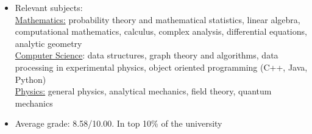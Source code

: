 \documentclass[10pt,a4paper,ragged2e]{altacv}
\begin{document}
\tagline{}

\begin{fullwidth}
\makecvheader
\end{fullwidth}



\begin{itemize}
\item Relevant subjects: \\
	\underline{Mathematics:} probability theory and mathematical statistics, linear algebra, computational mathematics, calculus, complex analysis, differential equations, analytic geometry\\
	\underline{Computer Science}: data structures, graph theory and algorithms, data processing in experimental physics, object oriented programming (C++, Java, Python)\\
	\underline{Physics:} general physics, analytical mechanics, field theory, quantum mechanics\\
\item Average grade: 8.58/10.00. In top 10\% of the university
\end{itemize}
\end{document}
